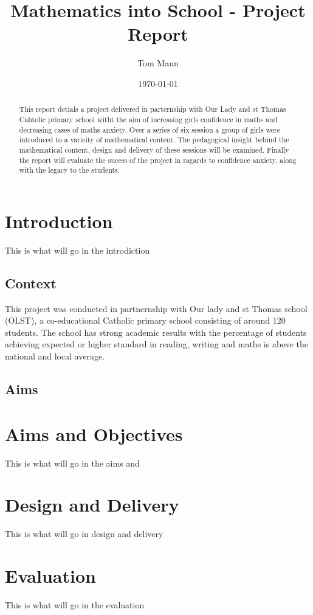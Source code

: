\documentclass[11pt, a4paper, notitlepage]{article}
\title{Mathematics into School - Project Report}
\author{Tom Mann}
\date{\today}
\begin{document}
\maketitle

\begin{abstract}
    This report detials a project delivered in parternship with Our Lady and st Thomas Cahtolic primary school witht the aim of increasing girls confidence in maths and decreasing cases of maths anxiety. Over a series of six session a group of girls were introduced to a varieity of mathematical content. The pedagogical insight behind the mathematical content, design and delivery of these sessions will be examined. Finally the report will evaluate the sucess of the project in ragards to confidence anxiety, along with the legacy to the students.
\end{abstract}

\clearpage

\tableofcontents

\clearpage

\section{Introduction}
This is what will go in the introdiction

\subsection{Context}
This project was conducted in partnernship with Our lady and st Thomas school (OLST), a  co-educational Catholic primary school consisting of around 120 students. The school has strong academic results with the percentage of students achieving expected or higher standard in reading, writing and maths is above the national and local average. \cite{test}


\subsection{Aims}

\section{Aims and Objectives}
This is what will go in the aims and \cite{enwiki:1279659344}

\section{Design and Delivery}

This is what will go in design and delivery

\section{Evaluation}
This is what will go in the evaluation



\end{document}
